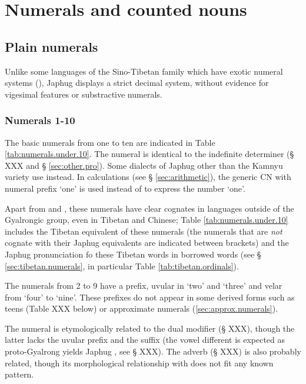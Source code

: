 \chapter{Numerals and counted nouns}

\section{Plain numerals} \label{sec:plain.numerals}
Unlike some languages of the Sino-Tibetan family which have exotic numeral systems (\citealt{mazaudon02nombre}), Japhug displays a strict decimal system, without evidence for vigesimal features or substractive numerals.


\subsection{Numerals 1-10}  \label{sec:one.to.ten}
The basic numerals from one to ten are indicated in Table \ref{tab:numerals.under.10}. The numeral  is identical to the indefinite determiner (§ XXX and § \ref{sec:other.pro}). Some dialects of Japhug other than the Kamnyu variety use  instead. In calculations (see § \ref{sec:arithmetic}), the generic CN with numeral prefix `one'  is used instead of  to express the number `one'.

Apart from  and , these numerals have clear cognates in languages outside of the Gyalrongic group, even in Tibetan and Chinese; Table \ref{tab:numerals.under.10} includes the Tibetan equivalent of these numerals (the numerals that are \textit{not} cognate with their Japhug equivalents are indicated between brackets) and the Japhug pronunciation fo these Tibetan words in borrowed words (see § \ref{sec:tibetan.numerals}, in particular Table \ref{tab:tibetan.ordinals}).

The numerals from 2 to 9 have a prefix, uvular  in `two' and `three' and velar  from `four' to `nine'. These prefixes do not appear in some derived forms such as teens (Table XXX below) or approximate numerals (\ref{sec:approx.numerals}).

The numeral  is etymologically related to the dual modifier  (§ XXX), though the latter lacks the uvular prefix and the  suffix (the vowel different is expected as proto-Gyalrong  yields Japhug , see § XXX). The adverb  (§ XXX) is also probably related, though its morphological relationship with  does not fit any known pattern.

